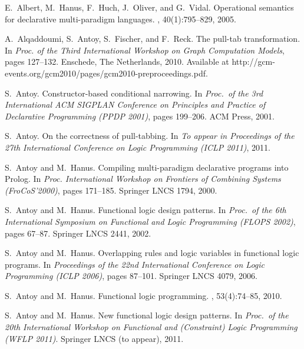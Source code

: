 \documentclass{llncs}
\begin{document}
%
%
\begin{thebibliography}{10}

E.~Albert, M.~Hanus, F.~Huch, J.~Oliver, and G.~Vidal.
\newblock Operational semantics for declarative multi-paradigm languages.
, 40(1):795--829, 2005.

A.~Alqaddoumi, S.~Antoy, S.~Fischer, and F.~Reck.
\newblock The pull-tab transformation.
\newblock In {\em Proc. of the Third International Workshop on Graph
  Computation Models}, pages 127--132. Enschede, The Netherlands, 2010.
\newblock Available at
  http://gcm-events.org/gcm2010/pages/gcm2010-preproceedings.pdf.

S.~Antoy.
\newblock Constructor-based conditional narrowing.
\newblock In {\em Proc.\ of the 3rd International ACM SIGPLAN Conference on
  Principles and Practice of Declarative Programming (PPDP 2001)}, pages
  199--206. ACM Press, 2001.

S.~Antoy.
\newblock On the correctness of pull-tabbing.
\newblock In {\em To appear in Proceedings of the 27th International Conference
  on Logic Programming (ICLP 2011)}, 2011.

S.~Antoy and M.~Hanus.
\newblock Compiling multi-paradigm declarative programs into {Prolog}.
\newblock In {\em Proc. International Workshop on Frontiers of Combining
  Systems (FroCoS'2000)}, pages 171--185. Springer LNCS 1794, 2000.

S.~Antoy and M.~Hanus.
\newblock Functional logic design patterns.
\newblock In {\em Proc.\ of the 6th International Symposium on Functional and
  Logic Programming (FLOPS 2002)}, pages 67--87. Springer LNCS 2441, 2002.

S.~Antoy and M.~Hanus.
\newblock Overlapping rules and logic variables in functional logic programs.
\newblock In {\em Proceedings of the 22nd International Conference on Logic
  Programming (ICLP 2006)}, pages 87--101. Springer LNCS 4079, 2006.

S.~Antoy and M.~Hanus.
\newblock Functional logic programming.
, 53(4):74--85, 2010.

S.~Antoy and M.~Hanus.
\newblock New functional logic design patterns.
\newblock In {\em Proc.\ of the 20th International Workshop on Functional and
  (Constraint) Logic Programming (WFLP 2011)}. Springer LNCS (to appear), 2011.


\end{thebibliography}
\end{document}
